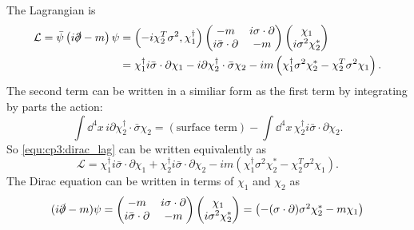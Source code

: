 \begin{problembody}
    \item The Lagrangian is
    \begin{align}\label{equ:cp3:dirac_lag}
        \mathcal{L} = \bar{\psi}\left(i\slashed{\partial} - m\right)\psi 
        & = \left(-i\chi_2^T\sigma^2, \chi_1^\dagger\right) \begin{pmatrix}
            -m & i\sigma\cdot\partial \\
            i\bar{\sigma}\cdot\partial & -m
        \end{pmatrix} \begin{pmatrix}
            \chi_1 \\ i\sigma^2\chi_2^\ast
        \end{pmatrix} \nonumber\\
        & = \chi_1^\dagger i\bar{\sigma}\cdot\partial\chi_1 
        - i\partial\chi_2^\dagger\cdot\bar{\sigma}\chi_2
        - im \left(\chi_1^\dagger\sigma^2\chi_2^\ast - \chi_2^T\sigma^2\chi_1\right).
    \end{align}
    The second term can be written in a similiar form as the first term by integrating by parts the action:
    \begin{equation*}
        \int \dd^4 x \, i\partial\chi_2^\dagger\cdot\bar{\sigma}\chi_2 = (\text{surface term}) - \int \dd^4x \, \chi_2^\dagger i\bar{\sigma}\cdot\partial\chi_2.
    \end{equation*}
    So \eqref{equ:cp3:dirac_lag} can be written equivalently as
    \begin{equation*}
        \mathcal{L} = \chi_1^\dagger i\bar{\sigma}\cdot\partial\chi_1
         + \chi_2^\dagger i\bar{\sigma}\cdot\partial\chi_2
         - im \left(\chi_1^\dagger\sigma^2\chi_2^\ast - \chi_2^T\sigma^2\chi_1\right).
    \end{equation*}
    The Dirac equation can be written in terms of $\chi_1$ and $\chi_2$ as
    \begin{equation*}
        (i\slashed{\partial} - m)\psi = \begin{pmatrix}
            -m & i\sigma\cdot\partial \\
            i\bar{\sigma}\cdot\partial & -m
        \end{pmatrix} \begin{pmatrix}
            \chi_1 \\ i\sigma^2 \chi_2^\ast
        \end{pmatrix} = \begin{pmatrix}
            -(\sigma\cdot\partial)\sigma^2\chi_2^\ast - m\chi_1 \\

\end{pmatrix}
\end{equation*}
\end{problembody}
